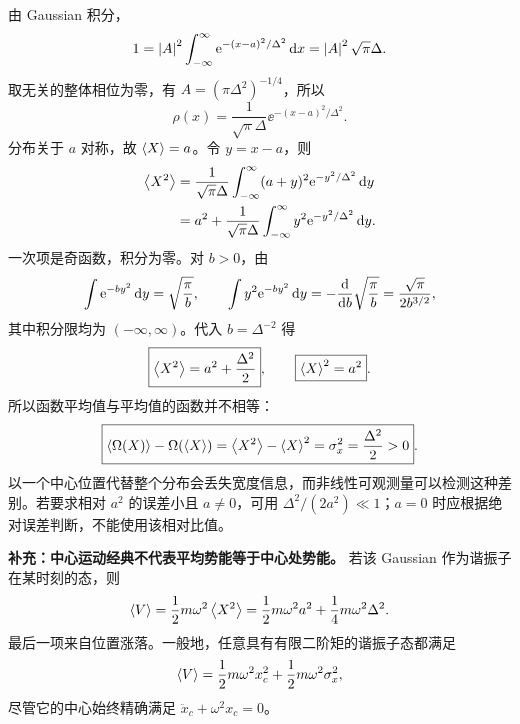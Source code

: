 \begin{checkedsolution}
由 Gaussian 积分，
\begin{equation}
  1=\left|A\right|^2\int_{-\infty}^{\infty}
       \mathrm{e}^{-(x-a)^2/\Delta^2}\mathop{}\!\mathrm{d} x
    =\left|A\right|^2\sqrt\pi\Delta.
\end{equation}
取无关的整体相位为零，有 $A=(\pi\Delta^2)^{-1/4}$，所以
\begin{equation}
  \rho(x)=\frac{1}{\sqrt\pi\Delta}
            \ee^{-(x-a)^2/\Delta^2}.
\end{equation}
分布关于 $a$ 对称，故 $\left\langle X \right\rangle=a$。令 $y=x-a$，则
\begin{align}
  \left\langle X^2 \right\rangle
  &=\frac{1}{\sqrt\pi\Delta}
     \int_{-\infty}^{\infty}(a+y)^2\mathrm{e}^{-y^2/\Delta^2}\mathop{}\!\mathrm{d} y\\
  &=a^2+\frac{1}{\sqrt\pi\Delta}
     \int_{-\infty}^{\infty}y^2\mathrm{e}^{-y^2/\Delta^2}\mathop{}\!\mathrm{d} y.
\end{align}
一次项是奇函数，积分为零。对 $b>0$，由
\begin{equation}
  \int\mathrm{e}^{-by^2}\mathop{}\!\mathrm{d} y=\sqrt{\frac\pi b},\qquad
  \int y^2\mathrm{e}^{-by^2}\mathop{}\!\mathrm{d} y
  =-\frac{\mathop{}\!\mathrm{d} }{\mathop{}\!\mathrm{d} b}\sqrt{\frac\pi b}
  =\frac{\sqrt\pi}{2b^{3/2}},
\end{equation}
其中积分限均为 $(-\infty,\infty)$。代入 $b=\Delta^{-2}$ 得
\begin{equation}
  \boxed{\left\langle X^2 \right\rangle=a^2+\frac{\Delta^2}{2}},
  \qquad
  \boxed{\left\langle X \right\rangle^2=a^2}.
\end{equation}
所以函数平均值与平均值的函数并不相等：
\begin{equation}
  \boxed{\left\langle \Omega(X) \right\rangle-\Omega(\left\langle X \right\rangle)
    =\left\langle X^2 \right\rangle-\left\langle X \right\rangle^2
    =\sigma_x^2=\frac{\Delta^2}{2}>0}.
\end{equation}
以一个中心位置代替整个分布会丢失宽度信息，而非线性可观测量可以检测这种差别。若要求相对 $a^2$ 的误差小且 $a\ne0$，可用 $\Delta^2/(2a^2)\ll1$；$a=0$ 时应根据绝对误差判断，不能使用该相对比值。

\textbf{补充：中心运动经典不代表平均势能等于中心处势能。}
若该 Gaussian 作为谐振子在某时刻的态，则
\begin{equation}
  \left\langle V \right\rangle=\frac12m\omega^2\left\langle X^2 \right\rangle
    =\frac12m\omega^2a^2+\frac14m\omega^2\Delta^2.
\end{equation}
最后一项来自位置涨落。一般地，任意具有有限二阶矩的谐振子态都满足
\begin{equation}
  \left\langle V \right\rangle=\frac12m\omega^2x_c^2
               +\frac12m\omega^2\sigma_x^2,
\end{equation}
尽管它的中心始终精确满足 $\ddot x_c+\omega^2x_c=0$。
\end{checkedsolution}
